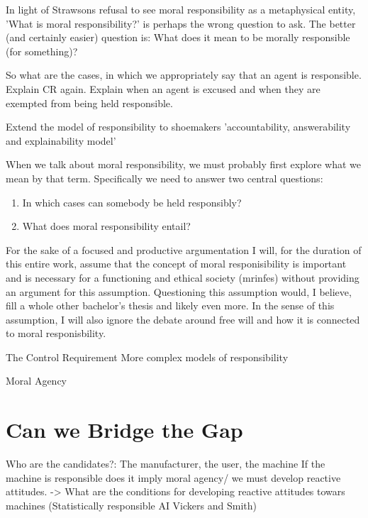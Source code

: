 \documentclass{article}
\begin{document}
In light of Strawsons refusal to see moral responsibility as a metaphysical
entity, 'What is moral responsibility?' is perhaps the wrong question to ask.
The better (and certainly easier) question is: What does it mean to be morally
responsible (for something)?

So what are the cases, in which we appropriately say that an agent is
responsible. Explain CR again. Explain when an agent is excused and when they
are exempted from being held responsible.

Extend the model of responsibility to shoemakers 'accountability, answerability
and explainability model'



When we talk about moral responsibility, we must probably first explore what we
mean by that term. Specifically we need to answer two central questions:\\

\begin{enumerate}
	\item In which cases can somebody be held responsibly?
	\item What does moral responsibility entail?
\end{enumerate}
For the sake of a focused and productive argumentation I will, for the duration
of this entire work, assume that the concept of moral responisibility is
important and is necessary for a functioning and ethical society
(\acrshort{mrinfes}) without
providing an argument for this assumption. Questioning this assumption would, I
believe, fill a whole other bachelor's thesis and likely even more. In the sense of
this assumption, I will also ignore the debate around free will and how it is
connected to moral responisbility.

The Control Requirement
More complex models of responsibility

Moral Agency
\section{Can we Bridge the Gap}

Who are the candidates?: The manufacturer, the user, the machine
If the machine is responsible does it imply moral agency/ we must develop
reactive attitudes. -> What are the conditions for developing reactive attitudes
towars machines (Statistically responsible AI Vickers and Smith)
\end{document}
